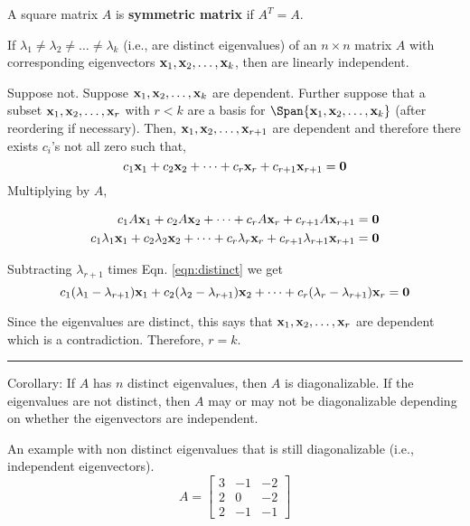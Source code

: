 \begin{questions}
\question A square matrix $A$ is  \textbf{symmetric matrix} if $A^T = A$.






\question  If $\lambda_1\ne \lambda_2 \ne  \dots \ne \lambda_k$ (i.e., are distinct eigenvalues) of an $n \times n$ matrix $A$ with corresponding eigenvectors ${\bf x}_1, {\bf x}_2, \dots, {\bf x}_k$, then are linearly independent.  

\proof Suppose not.  Suppose  ${\bf x}_1, {\bf x}_2, \dots, {\bf x}_k$ are dependent.  Further suppose that a subset ${\bf x}_1, {\bf x}_2, \dots, {\bf x}_r$ with $r < k$ are a basis for $\Span\{ {\bf x}_1, {\bf x}_2, \dots, {\bf x}_k \}$ (after reordering if necessary).  Then, ${\bf x}_1, {\bf x}_2, \dots, {\bf x}_{r+1}$ are dependent and therefore there exists $c_i$'s not all zero such that, 
\begin{equation}\label{eqn:distinct}  c_1 {\bf x}_1 +   c_2 {\bf x}_2 + \dots  + c_r {\bf x}_r + c_{r+1} {\bf x}_{r+1}  = {\bf 0} \end{equation}
Multiplying by $A$, 

\begin{align*} 
 c_1A {\bf x}_1 +   c_2 A{\bf x}_2 + \dots  + c_r A{\bf x}_r + c_{r+1} A {\bf x}_{r+1}  &= {\bf 0} \\
 c_1\lambda_1 {\bf x}_1 +   c_2 \lambda_2{\bf x}_2 + \dots  + c_r  \lambda_r {\bf x}_r + c_{r+1} \lambda_{r+1} {\bf x}_{r+1}  &= {\bf 0}
 \end{align*}

Subtracting $\lambda_{r+1}$ times Eqn. \ref{eqn:distinct} we get
\[  c_1(\lambda_1-\lambda_{r+1}) {\bf x}_1 +   c_2 (\lambda_2 - \lambda_{r+1}){\bf x}_2 + \dots  + c_r  (\lambda_r - \lambda_{r+1}) {\bf x}_r  = {\bf 0}   \] 

Since the eigenvalues are distinct, this says that ${\bf x}_1, {\bf x}_2, \dots, {\bf x}_r$  are dependent which is a contradiction.  Therefore, $r=k$.  

\rule[0.001in]{\textwidth}{0.00025in}


\question Corollary:  If $A$ has $n$ distinct eigenvalues, then $A$ is diagonalizable.  If the eigenvalues are not distinct, then $A$ may or may not be diagonalizable depending on whether the eigenvectors are independent.  

\begin{example} An example with non distinct eigenvalues that is still diagonalizable (i.e., independent eigenvectors).
	\[ A = \begin{bmatrix}  3 & -1  & -2 \\ 2  &  0  &   -2 \\  2  &  -1  &  -1 \end{bmatrix}   \]
\end{example}


\end{questions}
